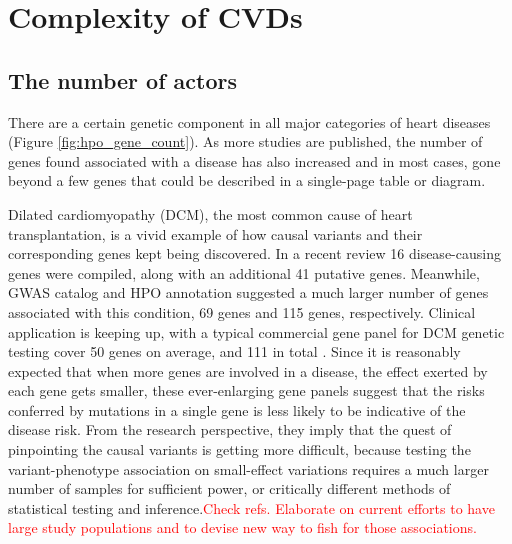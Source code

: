 \documentclass[letter]{bioinfo}
\newcommand{\comment}[1]{\textcolor{red}{#1}}
\begin{document}
\section{Complexity of CVDs}  %

\subsection{The number of actors}

% 
There are a certain genetic component in all major categories of heart diseases (Figure \ref{fig:hpo_gene_count}). As more studies are published, the number of genes found associated with a disease has also increased and in most cases, gone beyond a few genes that could be described in a single-page table or diagram.

Dilated cardiomyopathy (DCM), the most common cause of heart transplantation, is a vivid example of how causal variants and their corresponding genes kept being discovered. In a recent review \citep{Burke:2016:Clinical} 16 disease-causing genes were compiled, along with an additional 41 putative genes. Meanwhile, GWAS catalog and HPO annotation suggested a much larger number of genes associated with this condition, 69 genes and 115 genes, respectively. Clinical application is keeping up, with a typical commercial gene panel for DCM genetic testing cover 50 genes on average, and 111 in total \citep{McNally:2017:Dilated}.
Since it is reasonably expected that when more genes are involved in a disease, the effect exerted by each gene gets smaller, these ever-enlarging gene panels suggest that the risks conferred by mutations in a single gene is less likely to be indicative of the disease risk.
From the research perspective, they imply that the quest of pinpointing the causal variants is getting more difficult, because testing the variant-phenotype association on small-effect variations requires a much larger number of samples for sufficient power, or critically different methods of statistical testing and inference.\comment{Check refs. Elaborate on current efforts to have large study populations and to devise new way to fish for those associations.}
\end{document}
